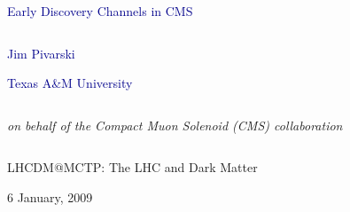 \documentclass[compress]{beamer}
\begin{document}
\newcommand{\met}{$E_{\rm{T}}\hspace{-1.1em}/$\hspace{0.7em}}
\newcommand{\metv}{$\vec{E}_{\rm{T}}\hspace{-1.1em}/$\hspace{0.7em}}

\begin{frame}
\vfill
\begin{center}
\textcolor{darkblue}{\Large Early Discovery Channels in CMS}

\vfill
\begin{columns}
\begin{center}
\large
\textcolor{darkblue}{Jim Pivarski}

\vspace{0.2 cm}
\scriptsize \textcolor{darkblue}{Texas A\&M University}
\end{center}
\end{columns}

\begin{columns}
\begin{center}
\scriptsize
{\it on behalf of the Compact Muon Solenoid (CMS) collaboration}
\end{center}
\end{columns}

\vfill
LHCDM@MCTP: The LHC and Dark Matter

\vspace{0.2 cm}
 6 January, 2009

\end{center}
\end{frame}


\small
\end{document}
